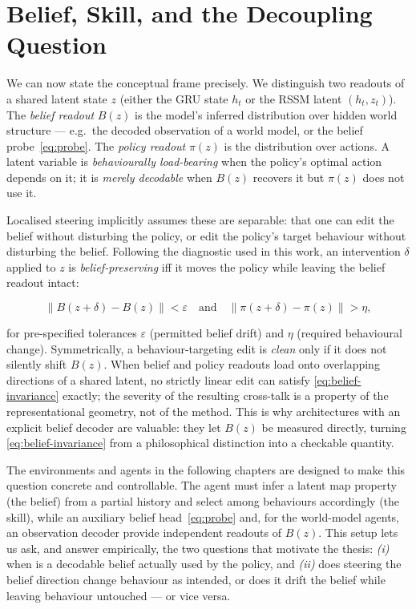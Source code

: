 \section{Belief, Skill, and the Decoupling Question}
\label{sec:bg-belief}

We can now state the conceptual frame precisely. We distinguish two readouts of a
shared latent state $z$ (either the GRU state $h_t$ or the RSSM latent
$(h_t,z_t)$). The \emph{belief readout} $B(z)$ is the model's inferred
distribution over hidden world structure --- e.g.\ the decoded observation of a
world model, or the belief probe~\eqref{eq:probe}. The \emph{policy readout}
$\pi(z)$ is the distribution over actions. A latent variable is
\emph{behaviourally load-bearing} when the policy's optimal action depends on it;
it is \emph{merely decodable} when $B(z)$ recovers it but $\pi(z)$ does not use
it.

Localised steering implicitly assumes these are separable: that one can edit the
belief without disturbing the policy, or edit the policy's target behaviour
without disturbing the belief. Following the diagnostic used in this work, an
intervention $\delta$ applied to $z$ is \emph{belief-preserving} iff it moves the
policy while leaving the belief readout intact:

\begin{equation}
    \big\lVert B(z + \delta) - B(z) \big\rVert < \varepsilon
    \quad\text{and}\quad
    \big\lVert \pi(z + \delta) - \pi(z) \big\rVert > \eta,
    \label{eq:belief-invariance}
\end{equation}

for pre-specified tolerances $\varepsilon$ (permitted belief drift) and $\eta$
(required behavioural change). Symmetrically, a behaviour-targeting edit is
\emph{clean} only if it does not silently shift $B(z)$. When belief and policy
readouts load onto overlapping directions of a shared latent, no strictly linear
edit can satisfy \eqref{eq:belief-invariance} exactly; the severity of the
resulting cross-talk is a property of the representational geometry, not of the
method. This is why architectures with an explicit belief decoder are valuable:
they let $B(z)$ be measured directly, turning \eqref{eq:belief-invariance} from a
philosophical distinction into a checkable quantity.

The environments and agents in the following chapters are designed to make this
question concrete and controllable. The agent must infer a latent map property
(the belief) from a partial history and select among behaviours accordingly (the
skill), while an auxiliary belief head~\eqref{eq:probe} and, for the world-model
agents, an observation decoder provide independent readouts of $B(z)$. This
setup lets us ask, and answer empirically, the two questions that motivate the
thesis: \emph{(i)} when is a decodable belief actually used by the policy, and
\emph{(ii)} does steering the belief direction change behaviour as intended, or
does it drift the belief while leaving behaviour untouched --- or vice versa.
